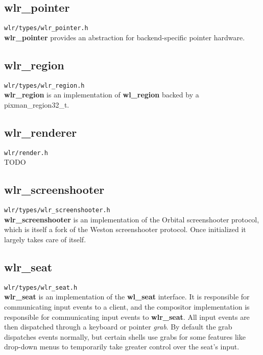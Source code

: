\documentclass{article}
\newcommand{\code}[1]{\texttt{#1}}
\begin{document}
\subsection{wlr_pointer}\label{wlr pointer}

\code{wlr/types/wlr_pointer.h}\\

\textbf{wlr_pointer} provides an abstraction for backend-specific pointer
hardware.

\subsection{wlr_region}\label{wlr region}

\code{wlr/types/wlr_region.h}\\

\textbf{wlr_region} is an implementation of \textbf{wl_region} backed by
a pixman_region32_t.

\subsection{wlr_renderer}\label{wlr renderer}

\code{wlr/render.h}\\

TODO

\subsection{wlr_screenshooter}\label{wlr screenshooter}

\code{wlr/types/wlr_screenshooter.h}\\

\textbf{wlr_screenshooter} is an implementation of the Orbital screenshooter
protocol, which is itself a fork of the Weston screenshooter protocol. Once
initialized it largely takes care of itself.

\subsection{wlr_seat}\label{wlr seat}

\code{wlr/types/wlr_seat.h}\\

\textbf{wlr_seat} is an implementation of the \textbf{wl_seat} interface. It is
responsible for communicating input events to a client, and the compositor
implementation is responsible for communicating input events to
\textbf{wlr_seat}. All input events are then dispatched through a keyboard or
pointer \emph{grab}. By default the grab dispatches events normally, but certain
shells use grabs for some features like drop-down menus to temporarily take
greater control over the seat's input.
\end{document}
